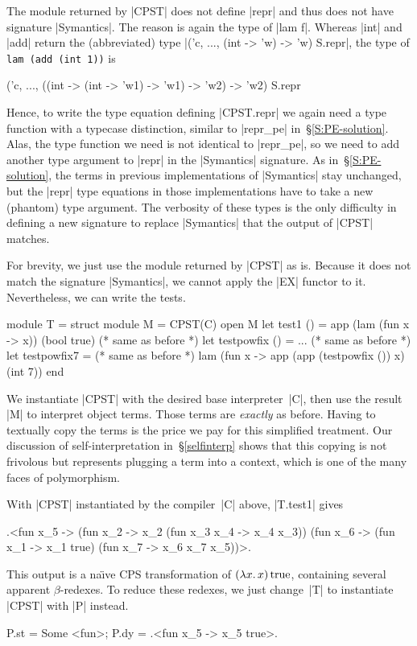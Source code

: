 The module returned by |CPST| does not define |repr|
and thus does not have signature |Symantics|.
The reason is again the type of |lam f|. Whereas
|int| and |add| return the (abbreviated) type
|('c, ..., (int -> 'w) -> 'w) S.repr|,
the type of \texttt{lam (add (int~1))} is
\begin{code}
('c, ..., ((int -> (int -> 'w1) -> 'w1) -> 'w2) -> 'w2) S.repr
\end{code}
Hence, to write the type equation defining |CPST.repr| we again need
a type function with a typecase distinction, similar to |repr_pe|
in~\S\ref{S:PE-solution}. Alas, the type function we need is not
identical to |repr_pe|, so we need to add another type argument to
|repr| in the |Symantics| signature. As in~\S\ref{S:PE-solution}, the
terms in previous implementations of |Symantics| stay unchanged, but the
|repr| type equations in those implementations have to take a new
(phantom) type argument.
The verbosity of these types is the only difficulty in defining a
new signature to replace |Symantics| that the output of |CPST| matches.

For brevity, we just
use the module returned by |CPST| as is. Because it does not
match the signature |Symantics|, we cannot apply the |EX| functor to it.
Nevertheless, we can write the tests.
\begin{code}
module T = struct
  module M = CPST(C)
  open M
  let test1 () =
       app (lam (fun x -> x)) (bool true)  (* same as before *)
  let testpowfix () = ...                  (* same as before *)
  let testpowfix7 =                        (* same as before *)
       lam (fun x -> app (app (testpowfix ()) x) (int 7))
end
\end{code}
We instantiate |CPST| with the desired base interpreter~|C|,
then use the result |M| to
interpret object terms. Those terms are \emph{exactly} as before.
Having to textually copy the terms is the
price we pay for this simplified treatment.
Our discussion of self\hyp interpretation in~\S\ref{selfinterp} shows
that this copying is not frivolous but represents plugging a term into
a context, which is one of the many faces of polymorphism.

With 
|CPST| instantiated by the compiler~|C| above,
|T.test1| gives
\begin{code}
.<fun x_5 -> (fun x_2 -> x_2 (fun x_3 x_4 -> x_4 x_3))
             (fun x_6 -> (fun x_1 -> x_1 true)
                         (fun x_7 -> x_6 x_7 x_5))>.
\end{code}
This output is a na\"{\i}ve CPS transformation of $(\mathopen{\lambda\mathord{x}.\,}x)\mathinner{\mathrm{true}}$,
containing several apparent $\beta$-redexes.  To reduce these
redexes, we just change~|T| to instantiate |CPST| with |P| instead.
\begin{code}
{P.st = Some <fun>; P.dy = .<fun x_5 -> x_5 true>.}
\end{code}

